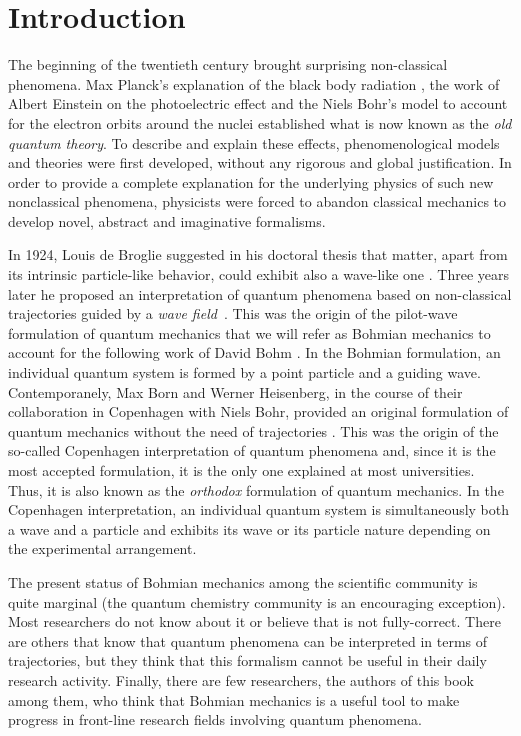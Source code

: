 \documentclass[onecolumn,nofootinbib, secnumarabic, amsmath, nobibnotes,11pt,aps,pra]{revtex4-1}
\begin{document}
\section{Introduction}


 The beginning of the twentieth century brought surprising non-classical phenomena. Max Planck's explanation of the black body radiation \cite{om.Planck-BlackBody}, the work of Albert Einstein on the photoelectric effect \cite{om.Einstein-Photoelectric} and the Niels Bohr's model to account for the electron orbits around the nuclei \cite{om.bohr,om.bohr2,om.bohr3} established what is now known as the \textit{old quantum theory}.
To describe and explain these effects, phenomenological models and theories were first developed, without any rigorous and global justification. In order to provide a complete explanation for the underlying physics of such new nonclassical phenomena, physicists were forced to abandon classical mechanics to develop novel, abstract and imaginative formalisms.

In 1924, Louis de Broglie suggested in his doctoral thesis that matter, apart from its intrinsic particle-like behavior, could exhibit also a wave-like one \cite{om.dB_AnnPhys}. Three years later he proposed an interpretation of quantum phenomena based on non-classical trajectories guided by a \emph{wave field}~\cite{om.debroglie1927b}.
This was the origin of the pilot-wave formulation of quantum mechanics that we will refer as Bohmian mechanics to account for the following work of David Bohm \cite{om.bohm1952a,om.bohm1952b}. In the Bohmian formulation, an individual quantum system is formed by a point particle and a guiding wave.
Contemporanely, Max Born and Werner Heisenberg, in the course of their collaboration in Copenhagen with Niels Bohr, provided an original formulation of quantum mechanics without the need of trajectories \cite{om.Born1926,om.Heisenber1925}. This was the origin of the so-called Copenhagen interpretation of quantum phenomena and, since it is the most accepted formulation, it is the only one explained at most universities. Thus, it is also known as the \emph{orthodox} formulation of quantum mechanics. In the Copenhagen interpretation, an individual quantum system is simultaneously both a wave and a particle and exhibits its wave or its particle nature depending on the experimental arrangement.

The present status of Bohmian mechanics among the scientific community is quite marginal (the quantum chemistry community is an encouraging exception). Most researchers do not know about it or believe that is not fully-correct. There are others that know that quantum phenomena can be interpreted in terms of trajectories, but they think that this formalism cannot be useful in their daily research activity. Finally, there are few researchers, the authors of this book among them, who think that Bohmian mechanics is a useful tool to make progress in front-line research fields involving quantum phenomena.
\end{document}
